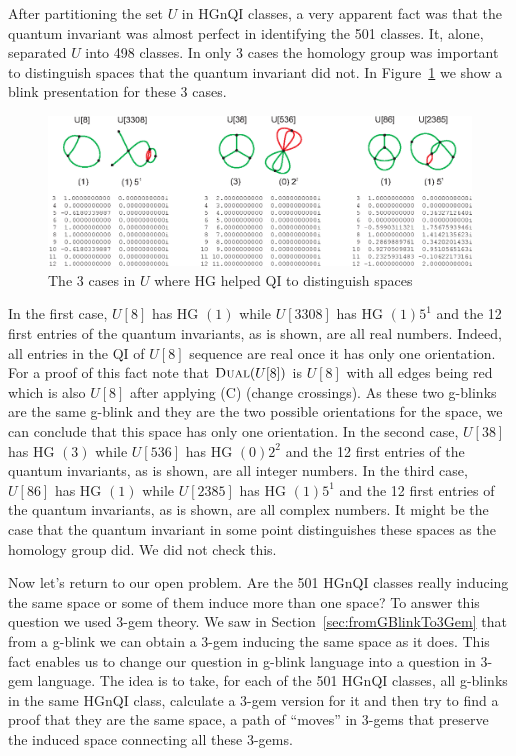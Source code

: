 After partitioning the set $U$ in HGnQI classes, a very apparent
fact was that the quantum invariant was almost perfect in
identifying the 501 classes. It, alone, separated $U$ into 498
classes. In only 3 cases the homology group was important to
distinguish spaces that the quantum invariant did not. In
Figure~\ref{fig:qiFailure} we show a blink presentation for
these 3 cases.
\begin{figure}[htp]
   \begin{center}
      \leavevmode
      \includegraphics[width=15cm]{A.figs/qifailure.eps}
   \end{center}
   \vspace{-0.7cm}
   \caption{ The 3 cases in $U$ where HG helped QI to distinguish spaces}
   \label{fig:qiFailure}
\end{figure}
In the first case, $U[8]$ has HG $(1)$
while $U[3308]$ has HG $(1) 5^1$ and the 12 first
entries of the quantum invariants, as is shown,
are all real numbers. Indeed, all entries in the QI of $U[8]$
sequence are real once it has only one orientation.
For a proof of this fact note that
$\textsc{Dual}(U[8])$ is $U[8]$ with
all edges being red which is also $U[8]$ after applying (C)
(change crossings). As these two g-blinks are the same
g-blink and they are the two possible orientations
for the space, we can conclude that this space has only
one orientation. In the second case, $U[38]$ has HG $(3)$
while $U[536]$ has HG $(0) 2^2$ and the 12 first
entries of the quantum invariants, as is shown,
are all integer numbers. In the third case, $U[86]$ has HG $(1)$
while $U[2385]$ has HG $(1) 5^1$ and the 12 first
entries of the quantum invariants, as is shown,
are all complex numbers. It might be the case that
the quantum invariant in some point distinguishes these
spaces as the homology group did. We did not check this.

Now let's return to our open problem. Are the 501 HGnQI
classes really inducing the same space or some of them
induce more than one space? To answer this question we
used 3-gem theory. We saw in Section~\ref{sec:fromGBlinkTo3Gem}
that from a g-blink we can obtain a 3-gem inducing the
same space as it does. This fact enables us to change
our question in g-blink language into a question in 3-gem language. The
idea is to take, for each of the 501 HGnQI classes, all g-blinks
in the same HGnQI class, calculate a 3-gem version for it
and then try to find a proof that they are the same space, \ie
a path of ``moves'' in 3-gems that preserve the induced space
connecting all these 3-gems.

